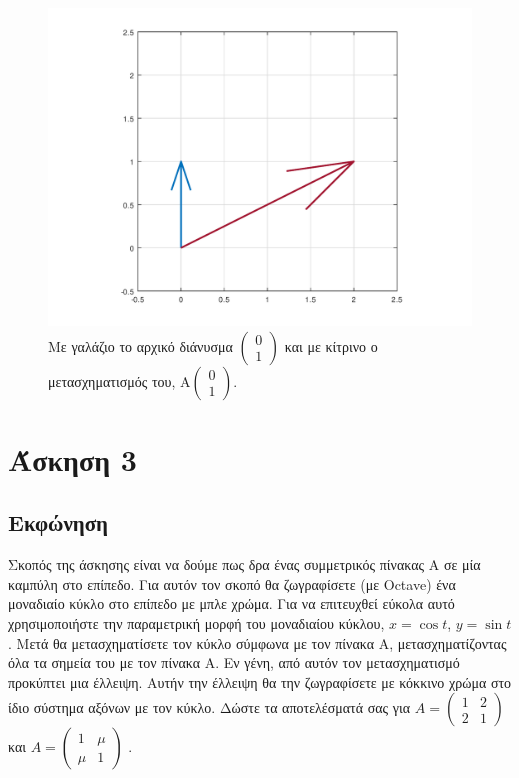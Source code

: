 \documentclass[a4paper,12pt]{article}
\begin{document}
\begin{figure}
    \centering
    \includegraphics[scale=0.6]{x2.png}
    \caption{Με γαλάζιο το αρχικό διάνυσμα
    $
        \begin{pmatrix}
            0 \\
            1
        \end{pmatrix}
    $
    και με κίτρινο ο μετασχηματισμός του,
    $
        \text{A} \begin{pmatrix}
            0 \\
            1
        \end{pmatrix}
    $.}
\end{figure}
\newpage\section{Άσκηση 3}
\subsection{Εκφώνηση}
Σκοπός της άσκησης είναι να δούμε πως δρα ένας συμμετρικός πίνακας Α σε μία καμπύλη στο επίπεδο.
Για αυτόν τον σκοπό θα ζωγραφίσετε (με Octave) ένα μοναδιαίο κύκλο στο επίπεδο με μπλε χρώμα.
Για να επιτευχθεί εύκολα αυτό χρησιμοποιήστε την παραμετρική μορφή του μοναδιαίου κύκλου, $x=\cos{t}$,
$y=\sin{t}$. Μετά θα μετασχηματίσετε τον κύκλο σύμφωνα με τον πίνακα Α, μετασχηματίζοντας όλα τα σημεία
του με τον πίνακα Α. Εν γένη, από αυτόν τον μετασχηματισμό προκύπτει μια έλλειψη. Αυτήν την έλλειψη θα την
ζωγραφίσετε με κόκκινο χρώμα στο ίδιο σύστημα αξόνων με τον κύκλο. Δώστε τα αποτελέσματά σας για
$
    A=\begin{pmatrix}
        1 & 2 \\
        2 & 1
    \end{pmatrix}
$
και
$
    A=\begin{pmatrix}
        1   & \mu \\
        \mu & 1
    \end{pmatrix}
$
.
\end{document}
